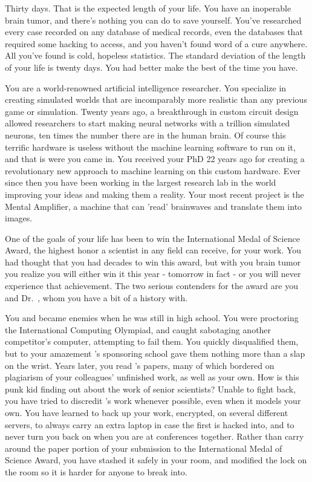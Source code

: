 \documentclass[char]{guildcamp1}
\begin{document}
\name{\cScientist{}}

Thirty days.  That is the expected length of your life.  You have an inoperable brain tumor, and there's nothing you can do to save yourself.  You've researched every case recorded on any database of medical records, even the databases that required some hacking to access, and you haven't found word of a cure anywhere.  All you've found is cold, hopeless statistics.  The standard deviation of the length of your life is twenty days.  You had better make the best of the time you have.

You are a world-renowned artificial intelligence researcher. You specialize in creating simulated worlds that are incomparably more realistic than any previous game or simulation.  Twenty years ago, a breakthrough in custom circuit design allowed researchers to start making neural networks with a trillion simulated neurons, ten times the number there are in the human brain.  Of course this terrific hardware is useless without the machine learning software to run on it, and that is were you came in.  You received your PhD  22 years ago for creating a revolutionary new approach to machine learning on this custom hardware.  Ever since then you have been working in the largest research lab in the world improving your ideas and making them a reality. Your most recent project is the Mental Amplifier, a machine that can 'read' brainwaves and translate them into images.

One of the goals of your life has been to win the International Medal of Science Award, the highest honor a scientist in any field can receive, for your work.  You had thought that you had decades to win this award, but with you brain tumor you realize you will either win it this year - tomorrow in fact - or you will never experience that achievement.  The two serious contenders for the award are you and Dr.~\cRival{\intro{}}, whom you have a bit of a history with.  

You and \cRival{} became enemies when he was still in high school.  You were proctoring the International Computing Olympiad, and caught \cRival{} sabotaging another competitor's computer, attempting to fail them. You quickly disqualified them, but to your amazement \cRival{}'s sponsoring school gave them nothing more than a slap on the wrist. Years later, you read \cRival{}'s papers, many of which bordered on plagiarism of your colleagues' unfinished work, as well as your own. How is this punk kid finding out about the work of senior scientists? Unable to fight back, you have tried to discredit \cRival{}'s work whenever possible, even when it models your own. You have learned to back up your work, encrypted, on several different servers, to always carry an extra laptop in case the first is hacked into, and to never turn you back on \cRival{} when you are at conferences together. Rather than carry around the paper portion of your submission to the International Medal of Science Award, you have stashed it safely in your room, and modified the lock on the room so it is harder for anyone to break into.
\end{document}
